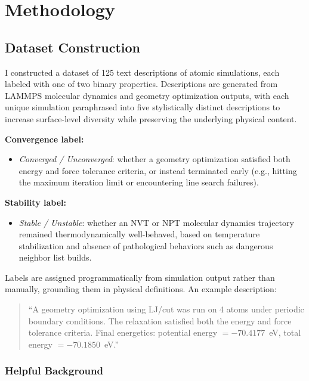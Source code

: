 \documentclass[11pt]{article}
\begin{document}
\section{Methodology}

\subsection{Dataset Construction}

I constructed a dataset of 125 text descriptions of atomic simulations, each labeled with one of two binary properties. Descriptions are generated from LAMMPS molecular dynamics and geometry optimization outputs, with each unique simulation paraphrased into five stylistically distinct descriptions to increase surface-level diversity while preserving the underlying physical content.

\textbf{Convergence label:}
\begin{itemize}
    \item \textit{Converged / Unconverged}: whether a geometry optimization satisfied both energy and force tolerance criteria, or instead terminated early (e.g., hitting the maximum iteration limit or encountering line search failures).
\end{itemize}

\textbf{Stability label:}
\begin{itemize}
    \item \textit{Stable / Unstable}: whether an NVT or NPT molecular dynamics trajectory remained thermodynamically well-behaved, based on temperature stabilization and absence of pathological behaviors such as dangerous neighbor list builds.
\end{itemize}

Labels are assigned programmatically from simulation output rather than manually, grounding them in physical definitions. An example description:

\begin{quote}
``A geometry optimization using LJ/cut was run on 4 atoms under periodic boundary conditions. The relaxation satisfied both the energy and force tolerance criteria. Final energetics: potential energy $= -70.4177$~eV, total energy $= -70.1850$~eV.''
\end{quote}

\subsubsection{Helpful Background}
\end{document}
